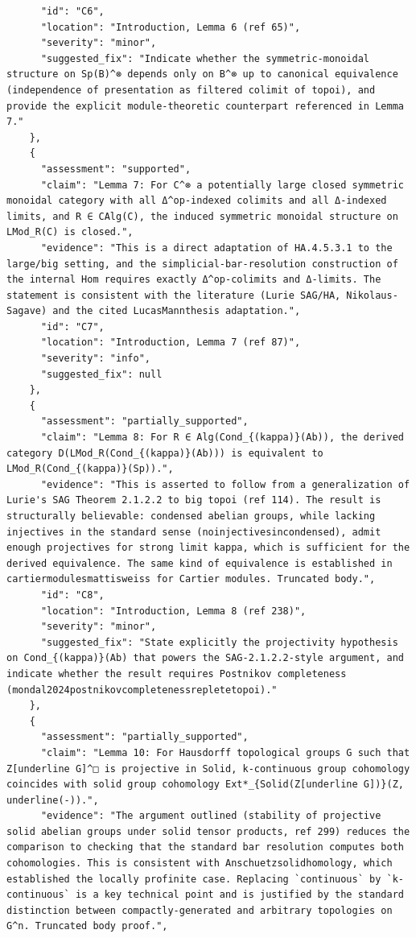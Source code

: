 \documentclass[11pt]{article}
\begin{document}
\begin{verbatim}
      "id": "C6",
      "location": "Introduction, Lemma 6 (ref 65)",
      "severity": "minor",
      "suggested_fix": "Indicate whether the symmetric-monoidal structure on Sp(B)^⊗ depends only on B^⊗ up to canonical equivalence (independence of presentation as filtered colimit of topoi), and provide the explicit module-theoretic counterpart referenced in Lemma 7."
    },
    {
      "assessment": "supported",
      "claim": "Lemma 7: For C^⊗ a potentially large closed symmetric monoidal category with all Δ^op-indexed colimits and all Δ-indexed limits, and R ∈ CAlg(C), the induced symmetric monoidal structure on LMod_R(C) is closed.",
      "evidence": "This is a direct adaptation of HA.4.5.3.1 to the large/big setting, and the simplicial-bar-resolution construction of the internal Hom requires exactly Δ^op-colimits and Δ-limits. The statement is consistent with the literature (Lurie SAG/HA, Nikolaus-Sagave) and the cited LucasMannthesis adaptation.",
      "id": "C7",
      "location": "Introduction, Lemma 7 (ref 87)",
      "severity": "info",
      "suggested_fix": null
    },
    {
      "assessment": "partially_supported",
      "claim": "Lemma 8: For R ∈ Alg(Cond_{(kappa)}(Ab)), the derived category D(LMod_R(Cond_{(kappa)}(Ab))) is equivalent to LMod_R(Cond_{(kappa)}(Sp)).",
      "evidence": "This is asserted to follow from a generalization of Lurie's SAG Theorem 2.1.2.2 to big topoi (ref 114). The result is structurally believable: condensed abelian groups, while lacking injectives in the standard sense (noinjectivesincondensed), admit enough projectives for strong limit kappa, which is sufficient for the derived equivalence. The same kind of equivalence is established in cartiermodulesmattisweiss for Cartier modules. Truncated body.",
      "id": "C8",
      "location": "Introduction, Lemma 8 (ref 238)",
      "severity": "minor",
      "suggested_fix": "State explicitly the projectivity hypothesis on Cond_{(kappa)}(Ab) that powers the SAG-2.1.2.2-style argument, and indicate whether the result requires Postnikov completeness (mondal2024postnikovcompletenessrepletetopoi)."
    },
    {
      "assessment": "partially_supported",
      "claim": "Lemma 10: For Hausdorff topological groups G such that Z[underline G]^□ is projective in Solid, k-continuous group cohomology coincides with solid group cohomology Ext*_{Solid(Z[underline G])}(Z, underline(-)).",
      "evidence": "The argument outlined (stability of projective solid abelian groups under solid tensor products, ref 299) reduces the comparison to checking that the standard bar resolution computes both cohomologies. This is consistent with Anschuetzsolidhomology, which established the locally profinite case. Replacing `continuous` by `k-continuous` is a key technical point and is justified by the standard distinction between compactly-generated and arbitrary topologies on G^n. Truncated body proof.",

\end{verbatim}
\end{document}
